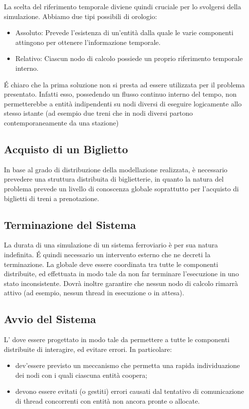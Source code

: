 	La scelta del riferimento temporale diviene quindi cruciale per lo svolgersi della simulazione. Abbiamo due tipi possibili di orologio:
		\begin{itemize}
			\item Assoluto: Prevede l'esistenza di un'entità dalla quale le varie componenti attingono per ottenere l'informazione temporale. 
			\item Relativo: Ciascun nodo di calcolo possiede un proprio riferimento temporale interno.
		\end{itemize}
		
	\'E chiaro che la prima soluzione non si presta ad essere utilizzata per il problema presentato. Infatti esso, possedendo un flusso continuo interno del tempo, non permetterebbe a entità indipendenti su nodi diversi di eseguire logicamente allo stesso istante (ad esempio due treni che in nodi diversi partono contemporaneamente da una stazione)

	\subsection{Acquisto di un Biglietto}
	
	In base al grado di distribuzione della modellazione realizzata, è necessario prevedere una struttura distribuita di biglietterie, in quanto la natura del problema prevede un livello di conoscenza globale soprattutto per l'acquisto di biglietti di treni a prenotazione.

	\subsection{Terminazione del Sistema}
	
	La durata di una simulazione di un sistema ferroviario è per sua natura indefinita. \'E quindi necessario un intervento esterno che ne decreti la terminazione.	La  globale deve essere coordinata tra tutte le componenti distribuite, ed effettuata in modo tale da non far terminare l'esecuzione in uno stato inconsistente. Dovrà inoltre garantire che nessun nodo di calcolo rimarrà attivo (ad esempio, nessun thread in esecuzione o in attesa).

	\subsection{Avvio del Sistema}
	
	L' dove essere progettato in modo tale da permettere a tutte le componenti distribuite di interagire, ed evitare errori. In particolare:
	\begin{itemize}
		\item dev'essere previsto un meccanismo che permetta una rapida individuazione dei nodi con i quali ciascuna entità coopera;
		\item devono essere evitati (o gestiti) errori causati dal tentativo di comunicazione di thread concorrenti con entità non ancora pronte o allocate.
	\end{itemize} 
	

